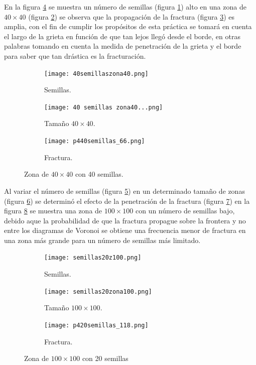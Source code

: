 \documentclass[a4paper]{article}
\begin{document}
\justify En la figura \ref{fig:2} se muestra un número de semillas (figura \ref{b40}) alto en una zona de $40\times 40$ (figura \ref{b41}) se observa que la propagación de la fractura (figura \ref{b101}) es amplia, con el fin de cumplir los propósitos de esta práctica se tomará en cuenta el largo de la grieta en función de que tan lejos llegó desde el borde, en otras palabras tomando en cuenta la medida de penetración de la grieta y el borde para saber que tan drástica es la fracturación. 

\medskip
\begin{figure}[h!]
    \centering
\begin{subfigure}[b]{0.3\linewidth}
\texttt{[image: 40semillaszona40.png]}
\caption{Semillas.}
\label{b40}
\end{subfigure}
\begin{subfigure}[b]{0.3\linewidth}
\texttt{[image: 40 semillas zona40...png]}
\caption{Tamaño $40\times 40$.}
\label{b41}
\end{subfigure}
\begin{subfigure}[b]{0.3\linewidth}
\texttt{[image: p440semillas\_66.png]}
\caption{Fractura.}
\label{b101}
\end{subfigure}
    \caption{Zona de $40\times 40$ con 40 semillas.}
    \label{fig:2}
\end{figure}




\justify Al variar  el número de semillas (figura \ref{b1}) en un determinado tamaño de zonas (figura \ref{b2}) se determinó el efecto de la penetración de la fractura (figura \ref{b3}) en la figura \ref{fig:3} se muestra una zona de $100\times 100$ con un número de semillas bajo, debido aque la probabilidad de que la fractura propague sobre la frontera y no entre los diagramas de Voronoi se obtiene una frecuencia menor de fractura en una zona más grande para un número de semillas más limitado.
\medskip
\begin{figure}[h!]
    \centering
\begin{subfigure}[b]{0.3\linewidth}
\texttt{[image: semillas20z100.png]}
\caption{Semillas.}
\label{b1}
\end{subfigure}
\begin{subfigure}[b]{0.3\linewidth}
\texttt{[image: semillas20zona100.png]}
\caption{Tamaño $100\times 100$.}
\label{b2}
\end{subfigure}
\begin{subfigure}[b]{0.3\linewidth}
\texttt{[image: p420semillas\_118.png]}
\caption{Fractura.}
\label{b3}
\end{subfigure}
    \caption{Zona de $100\times 100$  con 20 semillas}
    \label{fig:3}
\end{figure}
\end{document}
